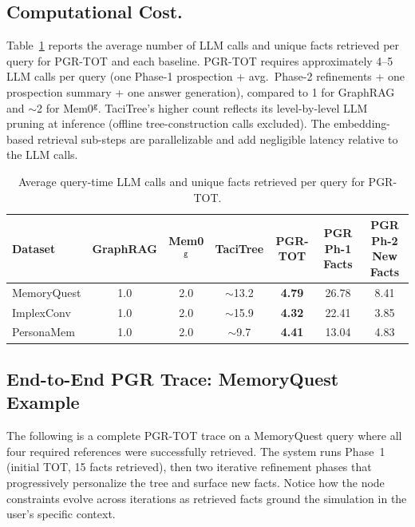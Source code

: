 \subsection{Computational Cost.}
Table~\ref{tab:llm-budget} reports the average number of LLM calls and unique facts retrieved per query for PGR-TOT and each baseline. PGR-TOT requires approximately 4--5 LLM calls per query (one Phase-1 prospection + avg.\ Phase-2 refinements + one prospection summary + one answer generation), compared to 1 for GraphRAG and $\sim$2 for Mem0$^\texttt{g}$. TaciTree’s higher count reflects its level-by-level LLM pruning at inference (offline tree-construction calls excluded). The embedding-based retrieval sub-steps are parallelizable and add negligible latency relative to the LLM calls.

\begin{table}[h]
\centering
\setlength{\tabcolsep}{5pt}
\renewcommand{\arraystretch}{1.1}
\caption{Average query-time LLM calls and unique facts retrieved per query for PGR-TOT.}
\vspace{2pt}
\small
\begin{tabular}{l|cccc|cc}
\toprule
\textbf{Dataset} & \textbf{GraphRAG} & \textbf{Mem0$^\texttt{g}$} & \textbf{TaciTree} & \textbf{PGR-TOT} & \textbf{PGR Ph-1 Facts} & \textbf{PGR Ph-2 New Facts} \\
\midrule
MemoryQuest & 1.0 & 2.0 & $\sim$13.2 & \textbf{4.79} & 26.78 & 8.41 \\
ImplexConv  & 1.0 & 2.0 & $\sim$15.9 & \textbf{4.32} & 22.41 & 3.85 \\
PersonaMem  & 1.0 & 2.0 & $\sim$9.7  & \textbf{4.41} & 13.04 & 4.83 \\
\bottomrule
\end{tabular}
\label{tab:llm-budget}
\end{table}



\subsection{End-to-End PGR Trace: MemoryQuest Example}
\label{sec:e2e-example}

The following is a complete PGR-TOT trace on a MemoryQuest query where all four required references were successfully retrieved. The system runs Phase~1 (initial TOT, 15 facts retrieved), then two iterative refinement phases that progressively personalize the tree and surface new facts. Notice how the node constraints evolve across iterations as retrieved facts ground the simulation in the user's specific context.

